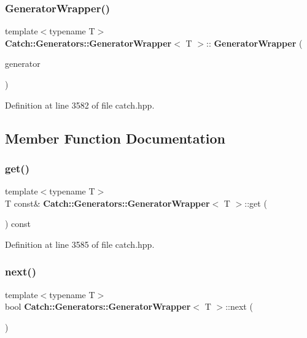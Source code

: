\subsubsection{GeneratorWrapper()}
{\footnotesize\ttfamily template$<$typename T$>$ \\
\textbf{ Catch\+::\+Generators\+::\+Generator\+Wrapper}$<$ T $>$\+::\textbf{ Generator\+Wrapper} (\begin{DoxyParamCaption}\item[{std\+::unique\+\_\+ptr$<$ \textbf{ I\+Generator}$<$ T $>$$>$}]{generator }\end{DoxyParamCaption})\hspace{0.3cm}{\ttfamily [inline]}}



Definition at line 3582 of file catch.\+hpp.



\subsection{Member Function Documentation}
\mbox{\label{class_catch_1_1_generators_1_1_generator_wrapper_a271f0f905f2c473c907550435b81e102}} 
\subsubsection{get()}
{\footnotesize\ttfamily template$<$typename T$>$ \\
T const\& \textbf{ Catch\+::\+Generators\+::\+Generator\+Wrapper}$<$ T $>$\+::get (\begin{DoxyParamCaption}{ }\end{DoxyParamCaption}) const\hspace{0.3cm}{\ttfamily [inline]}}



Definition at line 3585 of file catch.\+hpp.

\mbox{\label{class_catch_1_1_generators_1_1_generator_wrapper_acbfdca94811ae02461bd2cf5f60b666e}} 
\subsubsection{next()}
{\footnotesize\ttfamily template$<$typename T$>$ \\
bool \textbf{ Catch\+::\+Generators\+::\+Generator\+Wrapper}$<$ T $>$\+::next (\begin{DoxyParamCaption}{ }\end{DoxyParamCaption})\hspace{0.3cm}{\ttfamily [inline]}}



